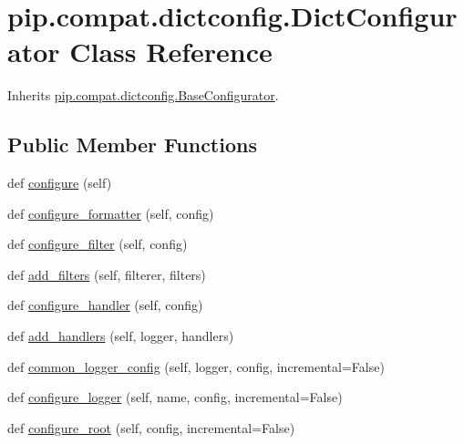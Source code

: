 \hypertarget{classpip_1_1compat_1_1dictconfig_1_1_dict_configurator}{}\section{pip.\+compat.\+dictconfig.\+Dict\+Configurator Class Reference}
\label{classpip_1_1compat_1_1dictconfig_1_1_dict_configurator}


Inherits \hyperlink{classpip_1_1compat_1_1dictconfig_1_1_base_configurator}{pip.\+compat.\+dictconfig.\+Base\+Configurator}.

\subsection*{Public Member Functions}
\begin{DoxyCompactItemize}
\item 
def \hyperlink{classpip_1_1compat_1_1dictconfig_1_1_dict_configurator_ab01688bcdc6f808469ccd85fea3c65e8}{configure} (self)
\item 
def \hyperlink{classpip_1_1compat_1_1dictconfig_1_1_dict_configurator_a4ff2905cb98d8683d034f3341e791bdc}{configure\+\_\+formatter} (self, config)
\item 
def \hyperlink{classpip_1_1compat_1_1dictconfig_1_1_dict_configurator_a1a6d51128f1d08ed08e24a9fbc48cadb}{configure\+\_\+filter} (self, config)
\item 
def \hyperlink{classpip_1_1compat_1_1dictconfig_1_1_dict_configurator_ae021ebb8efb45bd7d55fc63d1d83660a}{add\+\_\+filters} (self, filterer, filters)
\item 
def \hyperlink{classpip_1_1compat_1_1dictconfig_1_1_dict_configurator_ae964992a779b284544f92a4a3d9b38ef}{configure\+\_\+handler} (self, config)
\item 
def \hyperlink{classpip_1_1compat_1_1dictconfig_1_1_dict_configurator_ac0a9c1f0f10ee7c36b751f008d82db1d}{add\+\_\+handlers} (self, logger, handlers)
\item 
def \hyperlink{classpip_1_1compat_1_1dictconfig_1_1_dict_configurator_a4378355c71b84cf54b97d5fc43aa62ec}{common\+\_\+logger\+\_\+config} (self, logger, config, incremental=False)
\item 
def \hyperlink{classpip_1_1compat_1_1dictconfig_1_1_dict_configurator_afd02036274f91685a205c8e10ed09d50}{configure\+\_\+logger} (self, name, config, incremental=False)
\item 
def \hyperlink{classpip_1_1compat_1_1dictconfig_1_1_dict_configurator_a85ca9ccfa207fc0327fd3359ea749986}{configure\+\_\+root} (self, config, incremental=False)
\end{DoxyCompactItemize}
